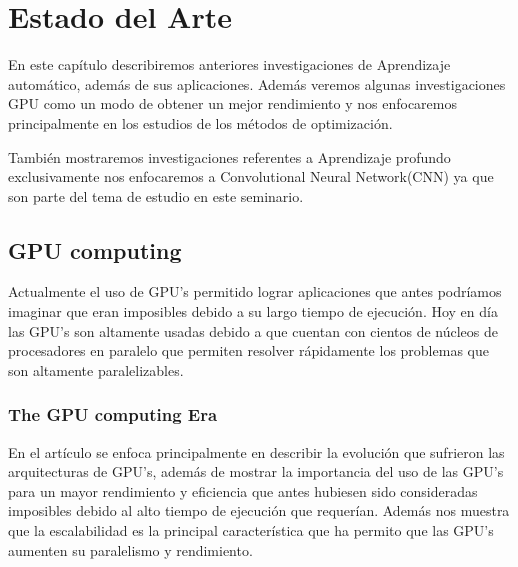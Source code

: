 \chapter{Estado del Arte}
En este capítulo describiremos anteriores investigaciones de Aprendizaje automático, además de sus aplicaciones. Además veremos algunas investigaciones GPU como un modo de obtener un mejor rendimiento y nos enfocaremos principalmente en los estudios de los métodos de optimización.

También mostraremos investigaciones referentes a Aprendizaje profundo exclusivamente nos enfocaremos a Convolutional Neural Network(CNN) ya que son parte del tema de estudio en este seminario. 





\section{GPU computing}
Actualmente el uso de GPU's permitido lograr aplicaciones que antes podríamos imaginar que eran imposibles debido a su largo tiempo de ejecución. Hoy en día las GPU's son altamente usadas debido a que cuentan con cientos de núcleos de procesadores en paralelo que permiten resolver rápidamente los problemas que son altamente paralelizables.
\subsection{The GPU computing Era}
	En el artículo se enfoca principalmente en describir la evolución que sufrieron las arquitecturas de GPU's, además de mostrar la importancia del uso de las GPU's para un mayor rendimiento y eficiencia que antes hubiesen sido consideradas imposibles debido al alto tiempo de ejecución que requerían. Además nos muestra que la escalabilidad es la principal característica que ha permito que las GPU's aumenten su paralelismo y rendimiento.
